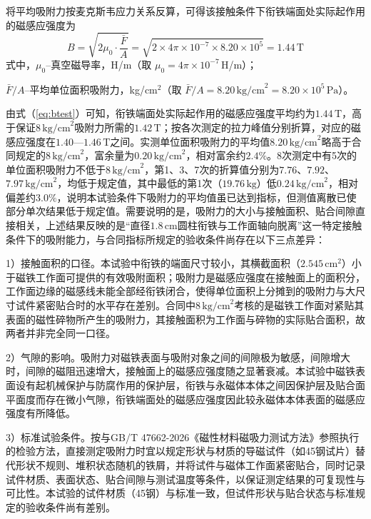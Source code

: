 将平均吸附力按麦克斯韦应力关系反算，可得该接触条件下衔铁端面处实际起作用的磁感应强度为
\begin{equation}
	B=\sqrt{2\mu_0\cdot\frac{\bar F}{A}}=\sqrt{2\times 4\pi\times 10^{-7}\times 8.20\times 10^{5}}=1.44\,\text{T}
	\label{eq:btest}
\end{equation}
式中，$\mu_0$--真空磁导率，H/m（取 $\mu_0=4\pi\times 10^{-7}$\,H/m）；

$\bar F/A$--平均单位面积吸附力，kg/cm$^2$（取 $\bar F/A=8.20\,\text{kg/cm}^2=8.20\times 10^{5}\,\text{Pa}$）。

由式（\ref{eq:btest}）可知，衔铁端面处实际起作用的磁感应强度平均约为$1.44\,\text{T}$，高于保证$8\,\text{kg/cm}^2$吸附力所需的$1.42\,\text{T}$；按各次测定的拉力峰值分别折算，对应的磁感应强度在$1.40$—$1.46\,\text{T}$之间。实测单位面积吸附力的平均值$8.20\,\text{kg/cm}^2$略高于合同规定的$8\,\text{kg/cm}^2$，富余量为$0.20\,\text{kg/cm}^2$，相对富余约$2.4\%$。8次测定中有5次的单位面积吸附力不低于$8\,\text{kg/cm}^2$，第1、3、7次的折算值分别为$7.76$、$7.92$、$7.97\,\text{kg/cm}^2$，均低于规定值，其中最低的第1次（$19.76\,\text{kg}$）低$0.24\,\text{kg/cm}^2$，相对偏差约$3.0\%$，说明本试验条件下吸附力的平均值虽已达到指标，但测值离散已使部分单次结果低于规定值。需要说明的是，吸附力的大小与接触面积、贴合间隙直接相关，上述结果反映的是“直径$1.8\,\text{cm}$圆柱衔铁与工作面轴向脱离”这一特定接触条件下的吸附能力，与合同指标所规定的验收条件尚存在以下三点差异：

1）接触面积的口径。本试验中衔铁的端面尺寸较小，其横截面积（$2.545\,\text{cm}^2$）小于磁铁工作面可提供的有效吸附面积；吸附力是磁感应强度在接触面上的面积分，工作面边缘的磁感线未能全部经衔铁闭合，使得单位面积上分摊到的吸附力与大尺寸试件紧密贴合时的水平存在差别。合同中$8\,\text{kg/cm}^2$考核的是磁铁工作面对紧贴其表面的磁性碎物所产生的吸附力，其接触面积为工作面与碎物的实际贴合面积，故两者并非完全同一口径。

2）气隙的影响。吸附力对磁铁表面与吸附对象之间的间隙极为敏感，间隙增大时，间隙的磁阻迅速增大，接触面上的磁感应强度随之显著衰减。本试验中磁铁表面设有起机械保护与防腐作用的保护层，衔铁与永磁体本体之间因保护层及贴合面平面度而存在微小气隙，衔铁端面处的磁感应强度因此较永磁体本体表面的磁感应强度有所降低。

3）标准试验条件。按与GB/T 47662-2026《磁性材料磁吸力测试方法》参照执行的检验方法，直接测定吸附力时宜以规定形状与材质的导磁试件（如45钢试片）替代形状不规则、堆积状态随机的铁屑，并将试件与磁体工作面紧密贴合，同时记录试件材质、表面状态、贴合间隙与测试温度等条件，以保证测定结果的可复现性与可比性。本试验的试件材质（45钢）与标准一致，但试件形状与贴合状态与标准规定的验收条件尚有差别。

